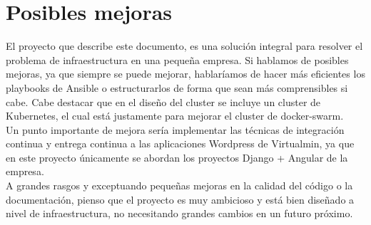 \section{Posibles mejoras}
        \begin{text}
            El proyecto que describe este documento, es una solución integral para resolver el problema de infraestructura en una pequeña empresa. Si hablamos de posibles mejoras, ya que siempre se puede mejorar, hablaríamos de hacer más eficientes los playbooks de Ansible o estructurarlos de forma que sean más comprensibles si cabe. Cabe destacar que en el diseño del cluster se incluye un cluster de Kubernetes, el cual está justamente para mejorar el cluster de docker-swarm. \\
            Un punto importante de mejora sería implementar las técnicas de integración continua y entrega continua a las aplicaciones Wordpress de Virtualmin, ya que en este proyecto únicamente se abordan los proyectos Django + Angular de la empresa. \\
            A grandes rasgos y exceptuando pequeñas mejoras en la calidad del código o la documentación, pienso que el proyecto es muy ambicioso y está bien diseñado a nivel de infraestructura, no necesitando grandes cambios en un futuro próximo.
        \end{text}